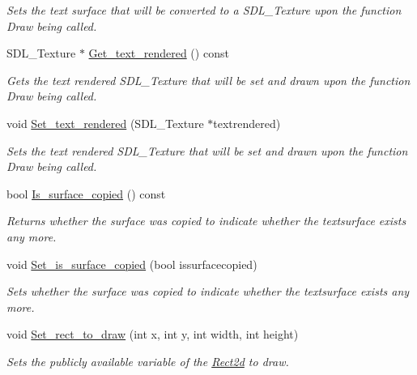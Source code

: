 \begin{DoxyCompactItemize}
\begin{DoxyCompactList}\small\item\em Sets the text surface that will be converted to a S\+D\+L\+\_\+\+Texture upon the function Draw being called. \end{DoxyCompactList}\item 
S\+D\+L\+\_\+\+Texture $\ast$ \hyperlink{classjetfuel_1_1draw_1_1Text_a127d078edc906adec8183d825abb5b23}{Get\+\_\+text\+\_\+rendered} () const
\begin{DoxyCompactList}\small\item\em Gets the text rendered S\+D\+L\+\_\+\+Texture that will be set and drawn upon the function Draw being called. \end{DoxyCompactList}\item 
void \hyperlink{classjetfuel_1_1draw_1_1Text_a49fbf3401fb8467bcc52345909e4bd27}{Set\+\_\+text\+\_\+rendered} (S\+D\+L\+\_\+\+Texture $\ast$textrendered)
\begin{DoxyCompactList}\small\item\em Sets the text rendered S\+D\+L\+\_\+\+Texture that will be set and drawn upon the function Draw being called. \end{DoxyCompactList}\item 
bool \hyperlink{classjetfuel_1_1draw_1_1Text_a3095fe89cec6db7a6a38f722dc249ccb}{Is\+\_\+surface\+\_\+copied} () const
\begin{DoxyCompactList}\small\item\em Returns whether the surface was copied to indicate whether the textsurface exists any more. \end{DoxyCompactList}\item 
void \hyperlink{classjetfuel_1_1draw_1_1Text_ab5b09d74d05260a4f903cb9d780c1948}{Set\+\_\+is\+\_\+surface\+\_\+copied} (bool issurfacecopied)
\begin{DoxyCompactList}\small\item\em Sets whether the surface was copied to indicate whether the textsurface exists any more. \end{DoxyCompactList}\item 
void \hyperlink{classjetfuel_1_1draw_1_1Text_a7d4b482620c679410eee2687288f3992}{Set\+\_\+rect\+\_\+to\+\_\+draw} (int x, int y, int width, int height)
\begin{DoxyCompactList}\small\item\em Sets the publicly available variable of the \hyperlink{classjetfuel_1_1draw_1_1Rect2d}{Rect2d} to draw. \end{DoxyCompactList}\item 

\end{DoxyCompactItemize}
